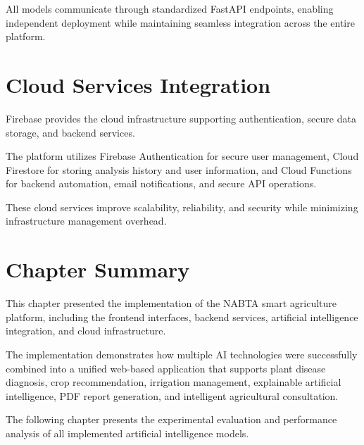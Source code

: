 All models communicate through standardized FastAPI endpoints, enabling independent deployment while maintaining seamless integration across the entire platform.

\section{Cloud Services Integration}
\label{sec:firebase}

Firebase provides the cloud infrastructure supporting authentication, secure data storage, and backend services.

The platform utilizes Firebase Authentication for secure user management, Cloud Firestore for storing analysis history and user information, and Cloud Functions for backend automation, email notifications, and secure API operations.

These cloud services improve scalability, reliability, and security while minimizing infrastructure management overhead.

\section{Chapter Summary}
\label{sec:chapter5_summary}

This chapter presented the implementation of the NABTA smart agriculture platform, including the frontend interfaces, backend services, artificial intelligence integration, and cloud infrastructure.

The implementation demonstrates how multiple AI technologies were successfully combined into a unified web-based application that supports plant disease diagnosis, crop recommendation, irrigation management, explainable artificial intelligence, PDF report generation, and intelligent agricultural consultation.

The following chapter presents the experimental evaluation and performance analysis of all implemented artificial intelligence models.
